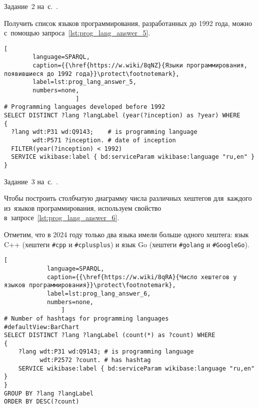 \newpage
\begin{task}
    \label{answer:prog_langs_5}
    \AnswerBackref Задание~2 на~с.~\pageref{prog_lang_test}.

    Получить список языков программирования, разработанных до 1992 года, 
    можно с~помощью запроса~\ref{lst:prog_lang_answer_5}. 

	\begin{lstlisting}[
        language=SPARQL, 
        caption={{\href{https://w.wiki/8qNZ}{Языки программирования, появившиеся до 1992 года}}\protect\footnotemark}, 
        label=lst:prog_lang_answer_5,
        numbers=none,
                    ]
# Programming languages developed before 1992
SELECT DISTINCT ?lang ?langLabel (year(?inception) as ?year) WHERE 
{
  ?lang wdt:P31 wd:Q9143;    # is programming language
        wdt:P571 ?inception. # date of inception
  FILTER(year(?inception) < 1992)
  SERVICE wikibase:label { bd:serviceParam wikibase:language "ru,en" }
}
\end{lstlisting}
\end{task}



\begin{task}
    \label{answer:prog_langs_6}
    \AnswerBackref Задание~3 на~с.~\pageref{prog_lang_test}.

    Чтобы построить столбчатую диаграмму числа различных хештегов 
    для~каждого из~языков программирования, 
    используем свойство  в~запросе~\ref{lst:prog_lang_answer_6}. 

    Отметим, что в 2024 году только два языка имели больше одного хештега: 
    язык C++ (хештеги \texttt{\#cpp} и \texttt{\#cplusplus}) и язык Go (хештеги \texttt{\#golang} и \texttt{\#GoogleGo}).

\begin{lstlisting}[
            language=SPARQL, 
            caption={{\href{https://w.wiki/8qRA}{Число хештегов у языков программирования}}\protect\footnotemark}, 
            label=lst:prog_lang_answer_6,
            numbers=none,
                ]
# Number of hashtags for programming languages
#defaultView:BarChart
SELECT DISTINCT ?lang ?langLabel (count(*) as ?count) WHERE
{
    ?lang wdt:P31 wd:Q9143; # is programming language
          wdt:P2572 ?count. # has hashtag
    SERVICE wikibase:label { bd:serviceParam wikibase:language "ru,en" }
} 
GROUP BY ?lang ?langLabel
ORDER BY DESC(?count)
\end{lstlisting}
\end{task}





